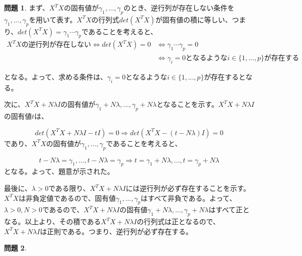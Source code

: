 \documentclass[titlepage]{jsarticle}
\theoremstyle{definition}
\newtheorem{Ex}{問題}
\theoremstyle{mystyle} %
\begin{document}
\begin{Ex}
まず、$X^TX$の固有値が$\gamma_1, ... , \gamma_p$のとき、逆行列が存在しない条件を$\gamma_1, ... , \gamma_p$を用いて表す。$X^TX$の行列式$det(X^TX)$が固有値の積に等しい、つまり、$det(X^TX)=\gamma_1\cdots\gamma_p$であることを考えると、
\begin{equation*}
\begin{split}
X^TXの逆行列が存在しない \Leftrightarrow det(X^TX)=0 &\Leftrightarrow \gamma_1\cdots\gamma_p=0 \\
&\Leftrightarrow  \gamma_i=0となるようなi\in\{1, ... , p\}が存在する
\end{split}
\end{equation*}

\noindent となる。よって、求める条件は、$\gamma_i=0$となるような$i\in\{1, ... , p\}$が存在するとなる。

次に、$X^TX+N\lambda I$の固有値が$\gamma_1+N\lambda, ... , \gamma_p+N\lambda$となることを示す。$X^TX+N\lambda I$の固有値$t$は、

\begin{equation*}
det(X^TX+N\lambda I-tI)=0 \Rightarrow det(X^TX-(t-N\lambda)I)=0 
\end{equation*}
であり、$X^TX$の固有値が$\gamma_1, ... , \gamma_p$であることを考えると、

\begin{equation*}
t-N\lambda=\gamma_1, ... , t-N\lambda=\gamma_p \Rightarrow t=\gamma_1+N\lambda, ... , t=\gamma_p+N\lambda
\end{equation*}
となる。よって、題意が示された。

最後に、$\lambda>0$である限り、$X^TX+N\lambda I$には逆行列が必ず存在することを示す。$X^TX$は非負定値であるので、固有値$\gamma_1, ... , \gamma_p$はすべて非負である。よって、$\lambda>0, N>0$であるので、$X^TX+N\lambda I$の固有値$\gamma_1+N\lambda, ... , \gamma_p+N\lambda$はすべて正となる。以上より、その積である$X^TX+N\lambda I$の行列式は正となるので、$X^TX+N\lambda I$は正則である。つまり、逆行列が必ず存在する。
\end{Ex}
\begin{Ex}

\end{Ex}
\end{document}
